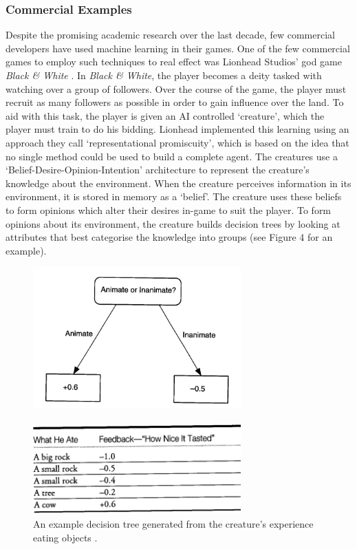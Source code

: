 \documentclass[a4paper,oneside]{report}
\begin{document}
\subsubsection{Commercial Examples}

Despite the promising academic research over the last decade, few commercial developers have used machine learning in their games. One of the few commercial games to employ such techniques to real effect was Lionhead Studios' god game \emph{Black \& White} \cite{:hc}. In \emph{Black \& White}, the player becomes a deity tasked with watching over a group of followers. Over the course of the game, the player must recruit as many followers as possible in order to gain influence over the land. To aid with this task, the player is given an AI controlled `creature', which the player must train to do his bidding. Lionhead implemented this learning using an approach they call `representational promiscuity', which is based on the idea that no single method could be used to build a complete agent. The creatures use a `Belief-Desire-Opinion-Intention' architecture to represent the creature's knowledge about the environment. When the creature perceives information in its environment, it is stored in memory as a `belief'. The creature uses these beliefs to form opinions which alter their desires in-game to suit the player. To form opinions about its environment, the creature builds decision trees by looking at attributes that best categorise the knowledge into groups (see Figure 4 for an example).

\begin{figure}[h!]
	\centering
		\includegraphics[width=80mm]{sources/images/TastyTree}\paragraph{}
    	\includegraphics[width=80mm]{sources/images/TastyTable}
    	\caption{An example decision tree generated from the creature's experience eating objects \cite{:hc}.}
\end{figure}
\end{document}
